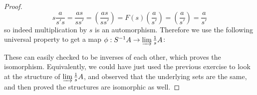 \documentclass{article}
\begin{document}
\begin{proof}
   \[
   s \frac{a}{s's}=\frac{as}{ss'}=(\frac{as}{ss'})=F(s)(\frac{a}{s'})=(\frac{a}{s'})=\frac{a}{s'}
   \]
   so indeed multiplication by $s$ is an automorphism. Therefore we use the following universal property to get a map $\phi:S^{-1}A\to \varinjlim \frac{1}{s}A$:
   \begin{center}
   \end{center}
   These can easily checked to be inverses of each other, which proves the isomorphism. Equivalently, we could have just used the previous exercise to look at the structure of $\varinjlim \frac{1}{s}A$, and observed that the underlying sets are the same, and then proved the structures are isomorphic as well.
\end{proof}
\end{document}

